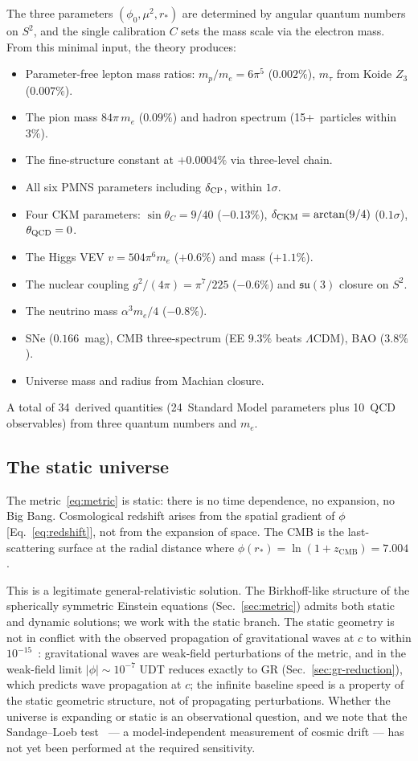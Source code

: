 \documentclass[aps,prd,twocolumn,superscriptaddress,nofootinbib,longbibliography]{revtex4-2}
\newcommand{\rstar}{r_{*}}
\newcommand{\phiz}{\phi_0}
\begin{document}
The three parameters $(\phiz, \mu^2, \rstar)$ are determined by
angular quantum numbers on $S^2$, and the single calibration $C$
sets the mass scale via the electron mass.  From this minimal input,
the theory produces:
\begin{itemize}
\item Parameter-free lepton mass ratios: $m_p/m_e = 6\pi^5$
  ($0.002\%$), $m_\tau$ from Koide $Z_3$ ($0.007\%$).
\item The pion mass $84\pi\,m_e$ ($0.09\%$) and hadron spectrum
  (15+~particles within $3\%$).
\item The fine-structure constant at $+0.0004\%$ via three-level
  chain.
\item All six PMNS parameters including $\delta_{\rm CP}$, within
  $1\sigma$.
\item Four CKM parameters: $\sin\theta_C = 9/40$ ($-0.13\%$),
  $\delta_{\rm CKM} = \arctan(9/4)$ ($0.1\sigma$), $\theta_{\rm QCD}
  = 0$.
\item The Higgs VEV $v = 504\pi^6 m_e$ ($+0.6\%$) and mass
  ($+1.1\%$).
\item The nuclear coupling $g^2/(4\pi) = \pi^7/225$ ($-0.6\%$)
  and $\mathfrak{su}(3)$ closure on $S^2$.
\item The neutrino mass $\alpha^3 m_e/4$ ($-0.8\%$).
\item SNe ($0.166$~mag), CMB three-spectrum (EE $9.3\%$ beats
  $\Lambda$CDM), BAO ($3.8\%$).
\item Universe mass and radius from Machian closure.
\end{itemize}
A total of 34~derived quantities (24~Standard Model parameters plus
10~QCD observables) from three quantum numbers and $m_e$.

\subsection{The static universe}

The metric~\eqref{eq:metric} is static: there is no time dependence,
no expansion, no Big Bang.  Cosmological redshift arises from the
spatial gradient of $\phi$ [Eq.~\eqref{eq:redshift}], not from the
expansion of space.  The CMB is the last-scattering surface at the
radial distance where $\phi(\rstar) = \ln(1+z_{\mathrm{CMB}}) = 7.004$.

This is a legitimate general-relativistic solution.  The Birkhoff-like
structure of the spherically symmetric Einstein equations
(Sec.~\ref{sec:metric}) admits both static and dynamic solutions; we
work with the static branch.  The static geometry is not in conflict
with the observed propagation of gravitational waves at $c$ to within
$10^{-15}$~\cite{GW170817,Will2014}: gravitational waves are weak-field
perturbations of the metric, and in the weak-field limit
$|\phi| \sim 10^{-7}$ UDT reduces exactly to GR
(Sec.~\ref{sec:gr-reduction}), which predicts wave propagation at
$c$; the infinite baseline speed is a property of the static geometric
structure, not of propagating perturbations.  Whether the universe is
expanding or static is an observational question, and we note that the
Sandage--Loeb test~\cite{Sandage1962,Loeb1998} --- a model-independent
measurement of cosmic drift --- has not yet been performed at the
required sensitivity.
\end{document}
